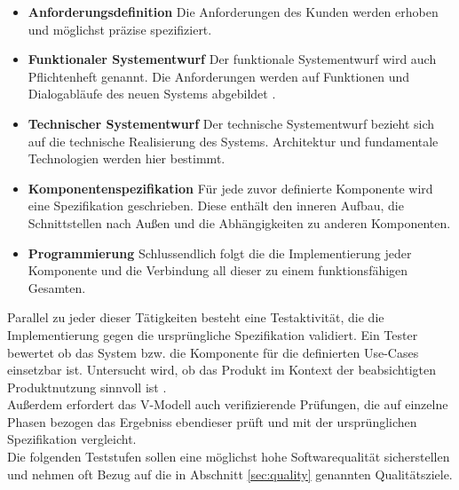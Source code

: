 \begin{itemize}
\item \textbf{Anforderungsdefinition} Die Anforderungen des Kunden werden erhoben und möglichst präzise spezifiziert.
\item \textbf{Funktionaler Systementwurf} Der funktionale Systementwurf wird auch Pflichtenheft genannt. Die Anforderungen werden auf Funktionen und Dialogabläufe des neuen Systems abgebildet \cite{spillner_basiswissen_2012}.
\item \textbf{Technischer Systementwurf} Der technische Systementwurf bezieht sich auf die technische Realisierung des Systems. Architektur und fundamentale Technologien werden hier bestimmt.
\item \textbf{Komponentenspezifikation} Für jede zuvor definierte Komponente wird eine Spezifikation geschrieben. Diese enthält den inneren Aufbau, die Schnittstellen nach Außen und die Abhängigkeiten zu anderen Komponenten.
\item \textbf{Programmierung} Schlussendlich folgt die die Implementierung jeder Komponente und die Verbindung all dieser zu einem funktionsfähigen Gesamten.
\end{itemize}

Parallel zu jeder dieser Tätigkeiten besteht eine Testaktivität, die die Implementierung gegen die ursprüngliche Spezifikation validiert. Ein Tester bewertet ob das System bzw. die Komponente für die definierten Use-Cases einsetzbar ist. Untersucht wird, ob das Produkt im Kontext der beabsichtigten Produktnutzung sinnvoll ist \cite{spillner_basiswissen_2012}.\\
Außerdem erfordert das V-Modell auch verifizierende Prüfungen, die auf einzelne Phasen bezogen das Ergebniss ebendieser prüft und mit der ursprünglichen Spezifikation vergleicht.\\
Die folgenden Teststufen sollen eine möglichst hohe Softwarequalität sicherstellen und nehmen oft Bezug auf die in Abschnitt \ref{sec:quality} genannten Qualitätsziele.

